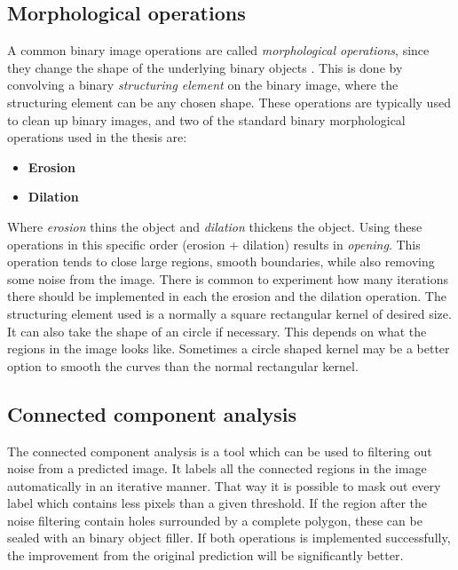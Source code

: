 \documentclass[USenglish]{ifimaster}  %
\begin{document}
\subsection{Morphological operations}
A common binary image operations are called \textit{morphological operations}, since
they change the shape of the underlying binary objects \cite{Ritter}. This is done by convolving a binary \textit{structuring element} on the binary image, where the structuring element can be any chosen shape. These operations are typically used to clean up binary images, and two of the standard binary morphological operations used in the thesis are: 
\newline
\begin{itemize}
    \item \textbf{Erosion}
    \item \textbf{Dilation}
\end{itemize}

Where \textit{erosion} thins the object and \textit{dilation} thickens the object. Using these operations in this specific order (erosion + dilation) results in \textit{opening}. This operation tends to close large regions, smooth boundaries, while also removing some noise from the image. There is common to experiment how many iterations there should be implemented in each the erosion and the dilation operation.
\newline
\newline
The structuring element used is a normally a square rectangular kernel of desired size. It can also take the shape of an circle if necessary. This depends on what the regions in the image looks like. Sometimes a circle shaped kernel may be a better option to smooth the curves than the normal rectangular kernel.
\subsection{Connected component analysis}
The connected component analysis is a tool which can be used to filtering out noise from a predicted image. It labels all the connected regions in the image automatically in an iterative manner. That way it is possible to mask out every label which contains less pixels than a given threshold. If the region after the noise filtering contain holes surrounded by a complete polygon, these can be sealed with an binary object filler. If both operations is implemented successfully, the improvement from the original prediction will be significantly better.
\end{document}
